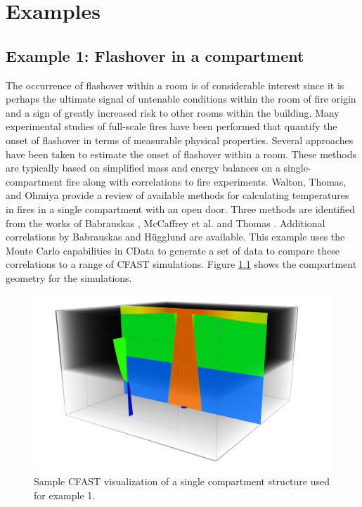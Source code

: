 \documentclass[12pt,twoside]{book}
\begin{document}
\chapter{Examples}

%
%

\section{Example 1: Flashover in a compartment}
\label{info:Flashover}
The occurrence of flashover within a room is of considerable interest since it is perhaps the ultimate signal of untenable conditions within the room of fire origin and a sign of greatly increased risk to other rooms within the building. Many experimental studies of full-scale fires have been performed that quantify the onset of flashover in terms of measurable physical properties. Several approaches have been taken to estimate the onset of flashover within a room. These methods are typically based on simplified mass and energy balances on a single-compartment fire along with correlations to fire experiments. Walton, Thomas, and Ohmiya \cite{Walton:2016} provide a review of available methods for calculating temperatures in fires in a single compartment with an open door. Three methods are identified from the works of Babrauskas \cite{Babrauskas:1980}, McCaffrey et al. \cite{McCaffrey:1981uq} and Thomas \cite{Thomas:1981fk}. Additional correlations by Babrauskas \cite{Babrauskas:1980} and H\"ugglund \cite{Hagglund:1980} are available. This example uses the Monte Carlo capabilities in CData to generate a set of data to compare these correlations to a range of CFAST simulations. Figure \ref{flashover_geometry} shows the compartment geometry for the simulations.

\begin{figure}[h!]
\centering
\includegraphics[width=4.5in]{FIGURES/Flashover.png}
\caption{Sample CFAST visualization of a single compartment structure used for example 1.}
\label{flashover_geometry}
\end{figure}
\end{document}
